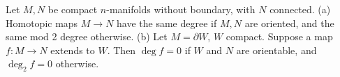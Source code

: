 Let $M, N$ be compact $n$-manifolds without boundary, with $N$ connected.
(a) Homotopic maps $M \to N$ have the same degree if $M, N$ are oriented, and the same mod 2 degree otherwise.
(b) Let $M = \partial W$, $W$ compact. Suppose a map $f: M \to N$ extends to $W$. Then $\deg f = 0$ if $W$ and $N$ are orientable, and $\deg_2 f = 0$ otherwise.
